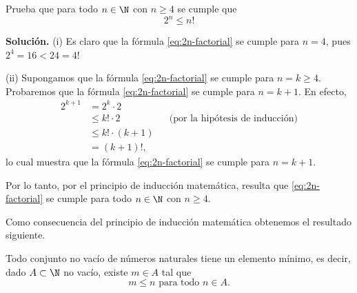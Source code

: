 \documentclass[12pt,a4paper]{book}
\begin{document}
    \begin{ejemplo}\label{ejm:4}
        Prueba que para todo $n\in\N$ con $n\geq 4$ se cumple que
        \begin{equation}\label{eq:2n-factorial}
            2^{n}\leq n!
        \end{equation}

        \textbf{Solución.} (i) Es claro que la fórmula \eqref{eq:2n-factorial} se cumple para $n=4$, pues
        $2^{4}=16<24=4!$

        (ii) Supongamos que la fórmula \eqref{eq:2n-factorial} se cumple para $n=k\geq 4$. Probaremos
        que la fórmula \eqref{eq:2n-factorial} se cumple para $n=k+1$. En efecto,
        \begin{align*}
            2^{k+1}&=2^{k}\cdot 2\\
            &\leq k!\cdot 2 &&\text{(por la hipótesis de inducción)}\\
            &\leq k!\cdot(k+1)\\
            &=(k+1)!,
        \end{align*}
        lo cual muestra que la fórmula \eqref{eq:2n-factorial} se cumple para $n=k+1$.

        Por lo tanto, por el principio de inducción matemática, resulta que \eqref{eq:2n-factorial}
        se cumple para todo $n\in\N$ con $n\geq 4$.
    \end{ejemplo}

    Como consecuencia del principio de inducción matemática obtenemos el
    resultado siguiente.

    \begin{proposicion}\label{prop:16}
        Todo conjunto no vacío de
        números naturales tiene un elemento mínimo, es decir, dado $A\subset\N$ no vacío,
        existe $m\in A$ tal que
        \begin{equation*}
            m\leq n\text{ para todo }n\in A.
        \end{equation*}
    \end{proposicion}
\end{document}
